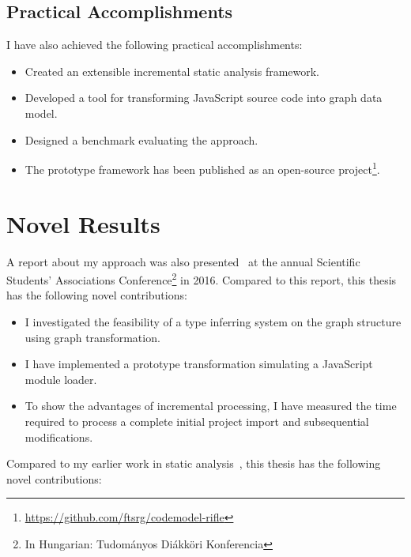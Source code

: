 \subsection{Practical Accomplishments}
I have also achieved the following practical accomplishments:

\begin{itemize}[topsep=0pt]
	\item Created an extensible incremental static analysis framework.
	\item Developed a tool for transforming JavaScript source code into graph data model.
	\item Designed a benchmark evaluating the approach.
	\item The prototype framework has been published as an open-source project\footnote{\small\url{https://github.com/ftsrg/codemodel-rifle}}.
\end{itemize}

\section{Novel Results}
A report about my approach was also presented~\cite{stein-daniel-tdk-2016} at the annual Scientific Students' Associations Conference\footnote{In Hungarian: Tudományos Diákköri Konferencia} in 2016. Compared to this report, this thesis has the following novel contributions:

\begin{itemize}[topsep=0pt]
	\item I investigated the feasibility of a type inferring system on the graph structure using graph transformation.

	\item I have implemented a prototype transformation simulating a JavaScript module loader.

	\item To show the advantages of incremental processing, I have measured the time required to process a complete initial project import and subsequential modifications.
\end{itemize}

Compared to my earlier work in static analysis~\cite{stein-daniel-tdk,stein-daniel-bsc,stein-daniel-ttc}, this thesis has the following novel contributions:

